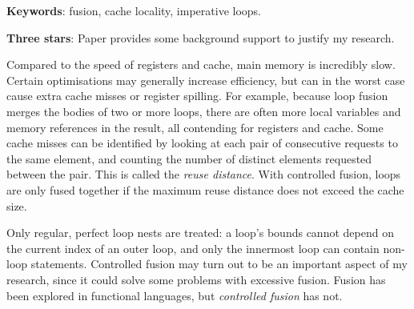 \documentclass[12pt,a4paper]{article}
\begin{document}
{\bf Keywords}: fusion, cache locality, imperative loops.

{\bf Three stars}: Paper provides some background support to justify my research.


Compared to the speed of registers and cache, main memory is incredibly slow.
Certain optimisations may generally increase efficiency, but can in the worst case cause extra cache misses or register spilling.
For example, because loop fusion merges the bodies of two or more loops, there are often more local variables
and memory references in the result, all contending for registers and cache.
Some cache misses can be identified by looking at each pair of consecutive requests to the same element, and counting the number of distinct elements requested between the pair.
This is called the \emph{reuse distance}.
With controlled fusion, loops are only fused together if the maximum reuse distance does not exceed the cache size. 

Only regular, perfect loop nests are treated: a loop's bounds cannot depend on the current index of an outer loop,
and only the innermost loop can contain non-loop statements.
Controlled fusion may turn out to be an important aspect of my research,
since it could solve some problems with excessive fusion.
Fusion has been explored in functional languages, but \emph{controlled fusion} has not.



\pagebreak
{}
\nocite{*}


\end{document}
